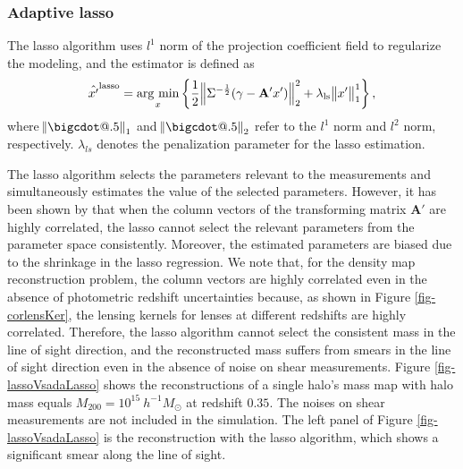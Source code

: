 \documentclass[twocolumn]{aastex62}
\makeatletter
\newcommand*\bigcdot{\mathpalette\bigcdot@{.5}}
\newcommand*\bigcdot@[2]{\mathbin{\vcenter{\hbox{\scalebox{#2}{$\m@th#1\bullet$}}}}}
\newcommand{\argmin}{\mathop{\rm arg~min}\limits}
\makeatother
\begin{document}
\subsubsection{Adaptive lasso}

The lasso algorithm uses $l^1$ norm of the projection coefficient field to
regularize the modeling, and the estimator is defined as
\begin{equation}
\hat{x'}^{\rm{lasso}}=\argmin_{x} \left\{ \frac{1}{2}\norm{\Sigma^{-\frac{1}{2}}(\gamma- \mathbf{A'} x')}_2^2+ \lambda_{\rm{ls}} \norm{x'}^1_1\right\},
\end{equation}
where $\norm{\bigcdot}_1$ and $\norm{\bigcdot}_2$ refer to the $l^1$ norm and
$l^2$ norm, respectively.  $\lambda_{ls}$ denotes the penalization parameter
for the lasso estimation.

The lasso algorithm selects the parameters relevant to the measurements and
simultaneously estimates the value of the selected parameters.  However, it has
been shown by \citet{AdaLASSO-Zou2006} that when the column vectors of the
transforming matrix $\mathbf{A'}$ are highly correlated, the lasso cannot
select the relevant parameters from the parameter space consistently.
Moreover, the estimated parameters are biased due to the shrinkage in the lasso
regression. We note that, for the density map reconstruction problem, the
column vectors are highly correlated even in the absence of photometric
redshift uncertainties because, as shown in Figure \ref{fig-corlensKer}, the
lensing kernels for lenses at different redshifts are highly correlated.
Therefore, the lasso algorithm cannot select the consistent mass in the line of
sight direction, and the reconstructed mass suffers from smears in the line of
sight direction even in the absence of noise on shear measurements.  Figure
\ref{fig-lassoVsadaLasso} shows the reconstructions of a single halo's mass map
with halo mass equals $M_{200}=10^{15} ~h^{-1}M_{\odot}$ at redshift $0.35$.
The noises on shear measurements are not included in the simulation.  The left
panel of Figure \ref{fig-lassoVsadaLasso} is the reconstruction with the lasso
algorithm, which shows a significant smear along the line of sight.
\end{document}
